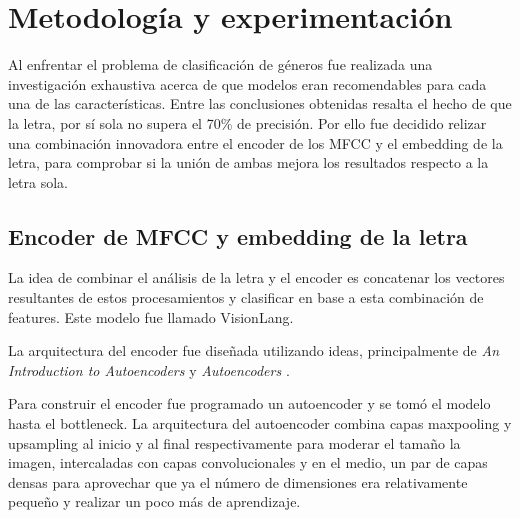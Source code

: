 \documentclass[colorinlistoftodos,twoside,twocolumn,10pt]{article} %
\begin{document}
\section{Metodología y experimentación}
Al enfrentar el problema de clasificaci\'on de g\'eneros fue realizada una investigaci\'on exhaustiva acerca de que modelos eran recomendables para cada una de las caracter\'isticas. Entre las conclusiones obtenidas resalta el hecho de que la letra, por s\'i sola no supera el 70\% de precisi\'on. Por ello fue decidido relizar una combinaci\'on innovadora entre el encoder de los MFCC y el embedding de la letra, para comprobar si la uni\'on de ambas mejora los resultados respecto a la letra sola. 

\subsection{Encoder de MFCC y embedding de la letra}
 La idea de combinar el an\'alisis de la letra y el encoder es concatenar los vectores resultantes de estos procesamientos y clasificar en base a esta combinaci\'on de features. Este modelo fue  llamado VisionLang.
 
 La arquitectura del encoder fue diseñada utilizando ideas, principalmente de \textit{An Introduction to Autoencoders} \cite{michelucci2022introduction} y \textit{Autoencoders} \cite{bank2021autoencoders}. 
 
Para construir el encoder fue programado un autoencoder y se tom\'o el modelo hasta el bottleneck. La arquitectura del autoencoder combina capas maxpooling y upsampling al inicio y al final respectivamente para moderar el tama\~no la imagen, intercaladas con capas convolucionales y en el medio, un par de capas densas para aprovechar que ya el n\'umero de dimensiones era relativamente peque\~no y realizar un poco m\'as de aprendizaje.
\end{document}
